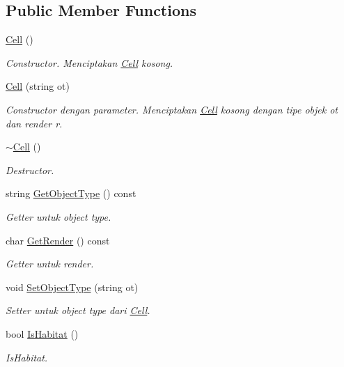 \subsection*{Public Member Functions}
\begin{DoxyCompactItemize}
\item 
\hyperlink{classCell_a394510643e8664cf12b5efaf5cb99f71}{Cell} ()
\begin{DoxyCompactList}\small\item\em Constructor. Menciptakan \hyperlink{classCell}{Cell} kosong. \end{DoxyCompactList}\item 
\hyperlink{classCell_a26ca23bd35b1be145b8c161ac36b9bda}{Cell} (string ot)
\begin{DoxyCompactList}\small\item\em Constructor dengan parameter. Menciptakan \hyperlink{classCell}{Cell} kosong dengan tipe objek ot dan render r. \end{DoxyCompactList}\item 
\hyperlink{classCell_a9fa559f7a28e2b4336c6879ca09304d8}{$\sim$\+Cell} ()
\begin{DoxyCompactList}\small\item\em Destructor. \end{DoxyCompactList}\item 
string \hyperlink{classCell_a6218f05e1d9dcdf9ed61c5196040b1bd}{Get\+Object\+Type} () const 
\begin{DoxyCompactList}\small\item\em Getter untuk object type. \end{DoxyCompactList}\item 
char \hyperlink{classCell_a81e6357d206db3a6e6299029dc2273e5}{Get\+Render} () const 
\begin{DoxyCompactList}\small\item\em Getter untuk render. \end{DoxyCompactList}\item 
void \hyperlink{classCell_ad814dd782c42728917888c893b99b9df}{Set\+Object\+Type} (string ot)
\begin{DoxyCompactList}\small\item\em Setter untuk object type dari \hyperlink{classCell}{Cell}. \end{DoxyCompactList}\item 
bool \hyperlink{classCell_ab44ecb9c8347d20216b335af4e7c3700}{Is\+Habitat} ()
\begin{DoxyCompactList}\small\item\em Is\+Habitat. \end{DoxyCompactList}\item 

\end{DoxyCompactItemize}
